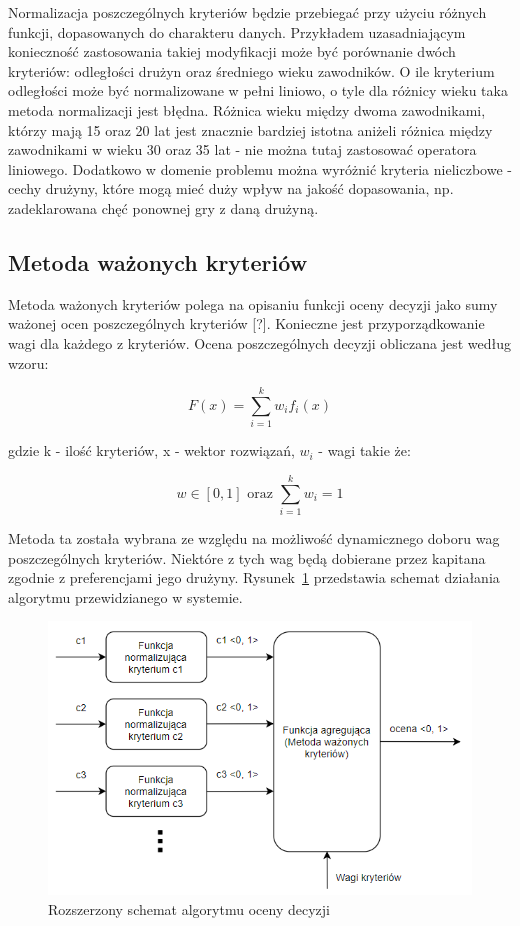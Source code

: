  Normalizacja poszczególnych kryteriów będzie przebiegać przy użyciu różnych funkcji, dopasowanych do charakteru danych. Przykładem uzasadniającym konieczność zastosowania takiej modyfikacji może być porównanie dwóch kryteriów: odległości drużyn oraz średniego wieku zawodników. O ile kryterium odległości może być normalizowane w pełni liniowo, o tyle dla różnicy wieku taka metoda normalizacji jest błędna. Różnica wieku między dwoma zawodnikami, którzy mają 15 oraz 20 lat jest znacznie bardziej istotna aniżeli różnica między zawodnikami w wieku 30 oraz 35 lat - nie można tutaj zastosować operatora liniowego. Dodatkowo w domenie problemu można wyróżnić kryteria nieliczbowe - cechy drużyny, które mogą mieć duży wpływ na jakość dopasowania, np. zadeklarowana chęć ponownej gry z daną drużyną.   

\subsection{Metoda ważonych kryteriów}

Metoda ważonych kryteriów polega na opisaniu funkcji oceny decyzji jako sumy ważonej ocen poszczególnych kryteriów [?]. Konieczne jest przyporządkowanie wagi dla każdego z kryteriów. Ocena poszczególnych decyzji obliczana jest według wzoru: 

\begin{equation}\label{eq:mwk}
F(x)=\sum_{i=1}^{k}w_{i}f_{i}(x)
\end{equation}

gdzie k - ilość kryteriów, x - wektor rozwiązań, $w_{i}$ - wagi takie że:

\begin{equation*}
w \in [0, 1] \mbox{ oraz } \sum_{i=1}^{k}w_{i} = 1
\end{equation*}

Metoda ta została wybrana ze względu na możliwość dynamicznego doboru wag poszczególnych kryteriów. Niektóre z tych wag będą dobierane przez kapitana zgodnie z preferencjami jego drużyny. Rysunek~\ref{fig:diagram-alg-ext} przedstawia schemat działania algorytmu przewidzianego w systemie.


\begin{figure}[H]
\centering
\includegraphics[width=0.8\linewidth]{03-koncept/rys/algorytm.PNG}
\caption{Rozszerzony schemat algorytmu oceny decyzji}
\label{fig:diagram-alg-ext}
\end{figure}


